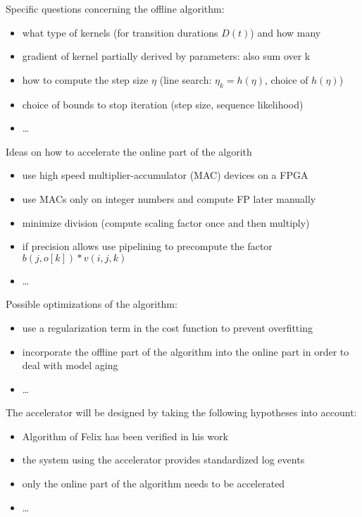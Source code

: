 \documentclass[12pt]{article} %
\begin{document}
Specific questions concerning the offline algorithm:
\begin{itemize}
    \item what type of kernels (for transition durations $ D(t) $) and how many
    \item gradient of kernel partially derived by parameters: also sum over k
    \item how to compute the step size $ \eta $ (line search: $ \eta_k
        = h(\eta) $, choice of $ h(\eta) $)
    \item choice of bounds to stop iteration (step size, sequence likelihood)
    \item \dots
\end{itemize}

Ideas on how to accelerate the online part of the algorith
\begin{itemize}
    \item use high speed multiplier-accumulator (MAC) devices on a FPGA
    \item use MACs only on integer numbers and compute FP later manually
    \item minimize division (compute scaling factor once and then multiply)
    \item if precision allows use pipelining to precompute the factor
        $ b(j, o[k]) * v(i, j, k) $
    \item \dots
\end{itemize}

Possible optimizations of the algorithm:
\begin{itemize}
    \item use a regularization term in the cost function to prevent overfitting
    \item incorporate the offline part of the algorithm into the online part in
        order to deal with model aging
    \item \dots
\end{itemize}

The accelerator will be designed by taking the following hypotheses into account:
\begin{itemize}
    \item Algorithm of Felix has been verified in his work
    \item the system using the accelerator provides standardized log events
    \item only the online part of the algorithm needs to be accelerated
    \item \dots
\end{itemize}
\end{document}

